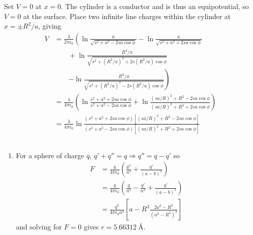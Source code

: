 \documentclass{article}
\begin{document}
Set $V = 0$ at $x = 0$. The cylinder is a conductor and is thus an equipotential, so $V = 0$ at the surface. Place two infinite line charges within the cylinder at $x = \pm R^2 / a$, giving \begin{align*}
  V & = \frac{\lambda}{2 \pi \epsilon_0} \left( \ln \frac{a}{\sqrt{s^2 + a^2 - 2 s a \cos \phi}} - \ln \frac{a}{\sqrt{s^2 + a^2 + 2 s a \cos \phi}} \right.                                                       \\
    & \qquad + \ln \frac{R^2 / a}{\sqrt{s^2 + (R^2 / a)^2 + 2 s (R^2 / a) \cos \phi}}                                                                                                                             \\
    & \qquad \left. - \ln \frac{R^2 / a}{\sqrt{s^2 + (R^2 / a)^2 - 2 s (R^2 / a) \cos \phi}} \right)                                                                                                              \\
    & = \frac{\lambda}{4 \pi \epsilon_0} \left( \ln \frac{s^2 + a^2 + 2 s a \cos \phi}{s^2 + a^2 - 2 s a \cos \phi} + \ln \frac{(s a / R)^2 + R^2 - 2 s a \cos \phi}{(s a / R)^2 + R^2 + 2 s a \cos \phi} \right) \\
    & = \frac{\lambda}{4 \pi \epsilon_0} \ln \frac{(s^2 + a^2 + 2 s a \cos \phi) [(s a / R)^2 + R^2 - 2 s a \cos \phi]}{(s^2 + a^2 - 2 s a \cos \phi) [(s a / R)^2 + R^2 + 2 s a \cos \phi]}
\end{align*}

\subsection{}

\begin{enumerate}
  \item For a sphere of charge $q$, $q' + q'' = q \Rightarrow q'' = q - q'$ so \begin{align*}
          F & = \frac{q}{4 \pi \epsilon_0} \left( \frac{q''}{a^2} + \frac{q'}{(a - b)^2} \right)                \\
            & = \frac{q}{4 \pi \epsilon_0} \left( \frac{q}{a^2} - \frac{q'}{a^2} + \frac{q'}{(a - b)^2} \right) \\
            & = \frac{q^2}{4 \pi \epsilon_0 a^3} \left[ a - R^3 \frac{2 a^2 - R^2}{(a^2 - R^2)^2} \right]
        \end{align*} and solving for $F = 0$ gives $r = \qty{5.66312}{\angstrom}$.
\end{enumerate}
\end{document}
